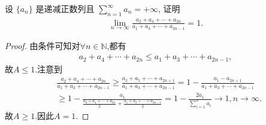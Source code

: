 \documentclass[../../main.tex]{subfiles}%
\begin{document}
\begin{example}
设 $\{a_n\}$ 是递减正数列且 $\sum\limits_{n=1}^{\infty}a_n = +\infty$, 证明
\begin{align*}
\lim_{n\rightarrow \infty}\frac{a_2+a_4+\cdots +a_{2n}}{a_1+a_3+\cdots +a_{2n-1}} = 1.
\end{align*}
\end{example}
\begin{proof}
由条件可知对$\forall n\in \mathbb{N}$,都有
\begin{align*}
a_2+a_4+\cdots +a_{2n}\leqslant a_1+a_3+\cdots +a_{2n-1},
\end{align*}
故$A\leqslant 1$.注意到
\begin{align*}
&\frac{a_2+a_4+\cdots +a_{2n}}{a_1+a_3+\cdots +a_{2n-1}}\geqslant \frac{a_3+a_5+\cdots +a_{2n+1}}{a_1+a_3+\cdots +a_{2n-1}}=1-\frac{a_1-a_{2n+1}}{a_1+a_3+\cdots +a_{2n-1}}
\\
&\geqslant 1-\frac{a_1}{\frac{a_2+a_4+\cdots +a_{2n}}{2}+\frac{a_1+a_3+\cdots +a_{2n-1}}{2}}=1-\frac{2a_1}{\sum\limits_{i=1}^n{a_i}}\rightarrow 1,n\rightarrow \infty .
\end{align*}
故$A\geqslant 1$.因此$A=1$.
\end{proof}
\end{document}
